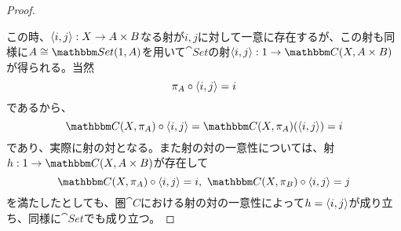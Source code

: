 \begin{proof}
\begin{center}
		\end{center}
    この時、$\langle i,j\rangle:X\rightarrow A\times B$なる射が$i,j$に対して一意に存在するが、この射も同様に$A\cong\arset{Set}{1}{A}$を用いて$\cat{Set}$の射$\mor{\tuple{i,j}}{1}{\arset{C}{X}{A\times B}}$が得られる。当然\[\pi_A\circ\langle i,j\rangle=i\]であるから、\[\arset{C}{X}{\pi_A}\circ\tuple{i,j} = \arset{C}{X}{\pi_A}(\tuple{i,j})=i\]であり、実際に射の対となる。また射の対の一意性については、射$\mor{h}{1}{\arset{C}{X}{A\times B}}$が存在して\[\arset{C}{X}{\pi_A}\circ\tuple{i,j}=i,\ \arset{C}{X}{\pi_B}\circ\tuple{i,j}=j\]を満たしたとしても、圏$\cat{C}$における射の対の一意性によって$h=\langle i,j\rangle$が成り立ち、同様に$\cat{Set}$でも成り立つ。


\end{proof}
